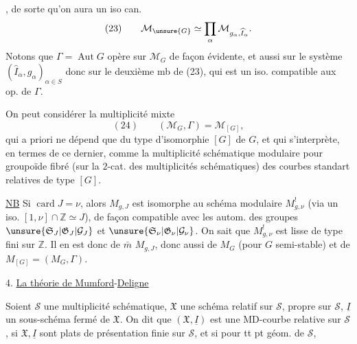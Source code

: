,  de sorte qu'on aura un iso can.
\[
(23)\qquad\mathcal M_{\unsure{G}}\simeq\prod_\alpha\mathcal M_{g_\alpha,\widehat I_\alpha}.
\]
Notons que $\Gamma=\operatorname{Aut}G$ opère sur $\mathcal M_G$ de façon évidente, et aussi sur le système $(\widehat I_\alpha,g_\alpha)_{\alpha\in S}$ donc sur le deuxième mb de (23), qui est un iso. compatible aux op. de $\Gamma$.

On peut considérer la multiplicité mixte
\[
(24)\qquad(\mathcal M_G,\Gamma)=\mathcal M_{[G]},
\]
qui a priori ne dépend que du type d'isomorphie $[G]$ de $G$, et qui s'interprète, en termes de ce dernier, comme la multiplicité schématique modulaire pour  groupoïde fibré (sur la $2$-cat. des multiplicités schématiques) des courbes standart relatives de type $[G]$.

\uline{NB} Si $\operatorname{card}J=\nu$, alors $M_{g,J}$ est isomorphe au schéma modulaire $M^!_{g,\nu}$ (via un iso. $[1,\nu]\cap\mathbb Z\simeq J$), de façon compatible avec les autom. des groupes $\unsure{\mathfrak S_J|\mathfrak G_J|\mathcal G_J}$ et $\unsure{\mathfrak S_\nu|\mathfrak G_\nu|\mathcal G_\nu}$. On sait que $M^!_{g,\nu}$ est lisse de type fini sur $\mathbb Z$. Il en est donc de $\bar m$  $M_{g,J}$, donc aussi de $M_G$ (pour $G$ semi-stable) et de $M_{[G]}=(M_G,\Gamma)$.

4. \uline{La théorie de Mumford}-\uline{Deligne}

Soient $\mathcal S$ une multiplicité schématique, $\mathfrak X$ une  schéma relatif sur $\mathcal S$, propre sur $\mathcal S$, $\underline I$ un sous-schéma fermé de $\mathfrak X$. On dit que $(\mathfrak X,\underline I)$ est une MD-courbe relative sur $\mathcal S$, si $\mathfrak X,\underline I$ sont plats de présentation finie sur $\mathcal S$, et si pour tt pt géom. de $\mathcal S$, 

